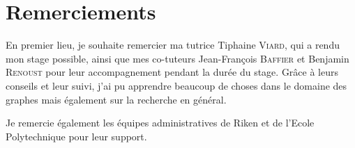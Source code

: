 \documentclass[11pt,a4paper]{article}
\theoremstyle{definition}
\theoremstyle{remark}
\theoremstyle{remark}
\def \stgs {stream graphs}
\def \stgms {stream graphs multicouches}
\begin{document}
\begin{abstract}

Ce rapport de stage traite d'un nouvel objet permettant de traiter de graphes complexes dépendants du temps : les \textbf{\stgms{}}. 

Dans un premier lieu, nous ferons un état de l'art sur les formalismes existant pour traiter de graphes complexes et de graphes temporels. Nous présenterons ainsi les graphes multicouches et les \stgs{} qui nous servirons à construire les \stgms{}. 

Dans un second temps, nous donnerons une définition formelle des \stgms{}, et nous montrerons en quoi ce nouvel objet est une généralisation des objets existants. Puis nous définirons des mesures permettant d'étudier les \stgms{}, qui prennent en compte l'aspect à la fois multicouche et temporel.

Nous présenterons ensuite la bibliothèque python concue pour traiter ce type d'objet, ainsi qu'un exemple d'utilisation avec un jeu de données temporel multicouche.

Enfin, nous donnerons un ensemble de pistes que nous pourrons explorer pour la suite du stage.

\end{abstract}


\begin{abstract}

\end{abstract}


\newpage 

\tableofcontents
\newpage


\section*{Remerciements}

    En premier lieu, je souhaite remercier ma tutrice Tiphaine \textsc{Viard}, qui a rendu mon stage possible, ainsi que mes co-tuteurs Jean-François \textsc{Baffier} et Benjamin \textsc{Renoust} pour leur accompagnement pendant la durée du stage. Grâce à leurs conseils et leur suivi, j'ai pu apprendre beaucoup de choses dans le domaine des graphes mais également sur la recherche en général.
    
    Je remercie également les équipes administratives de Riken et de l'Ecole Polytechnique pour leur support.
\end{document}
